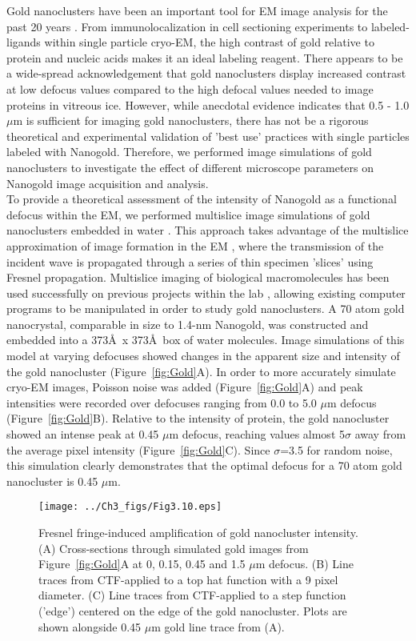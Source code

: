 Gold nanoclusters have been an important tool for EM image analysis for the past 20 years \cite{Hainfeld_2000}. From immunolocalization in cell sectioning experiments to labeled-ligands within single particle cryo-EM, the high contrast of gold relative to protein and nucleic acids makes it an ideal labeling reagent. There appears to be a wide-spread acknowledgement that gold nanoclusters display increased contrast at low defocus values compared to the high defocal values needed to image proteins in vitreous ice. However, while anecdotal evidence indicates that 0.5 - 1.0 $\mu$m is sufficient for imaging gold nanoclusters, there has not be a rigorous theoretical and experimental validation of 'best use' practices with single particles labeled with Nanogold. Therefore, we performed image simulations of gold nanoclusters to investigate the effect of different microscope parameters on Nanogold image acquisition and analysis.\\
\indent To provide a theoretical assessment of the intensity of Nanogold as a functional defocus within the EM, we performed multislice image simulations of gold nanoclusters embedded in water \cite{Goodman,Hall,Kirkland}. This approach takes advantage of the multislice approximation of image formation in the EM \cite{Goodman}, where the transmission of the incident wave is propagated through a series of thin specimen 'slices' using Fresnel propagation. Multislice imaging of biological macromolecules has been used successfully on previous projects within the lab \cite{Hall}, allowing existing computer programs to be manipulated in order to study gold nanoclusters. A 70 atom gold nanocrystal, comparable in size to 1.4-nm Nanogold, was constructed and embedded into a 373\AA\ x 373\AA\ box of water molecules. Image simulations of this model at varying defocuses showed changes in the apparent size and intensity of the gold nanocluster (Figure~\ref{fig:Gold}A). In order to more accurately simulate cryo-EM images, Poisson noise was added (Figure~\ref{fig:Gold}A) and peak intensities were recorded over defocuses ranging from 0.0 to 5.0 $\mu$m defocus (Figure~\ref{fig:Gold}B). Relative to the intensity of protein, the gold nanocluster showed an intense peak at 0.45 $\mu$m defocus, reaching values almost 5$\sigma$ away from the average pixel intensity (Figure~\ref{fig:Gold}C). Since $\sigma$=3.5 for random noise, this simulation clearly demonstrates that the optimal defocus for a 70 atom gold nanocluster is 0.45 $\mu$m.\\
\begin{figure}
\centering
\texttt{[image: ../Ch3\_figs/Fig3.10.eps]}
\caption[Fresnel fringe-induced amplification of gold nanocluster intensity]{Fresnel fringe-induced amplification of gold nanocluster intensity. (A) Cross-sections through simulated gold images from Figure~\ref{fig:Gold}A at 0, 0.15, 0.45 and 1.5 $\mu$m defocus. (B) Line traces from CTF-applied to a top hat function with a 9 pixel diameter. (C) Line traces from CTF-applied to a step function ('edge') centered on the edge of the gold nanocluster. Plots are shown alongside 0.45 $\mu$m gold line trace from (A).}
\label{fig:Traces}
\end{figure}

